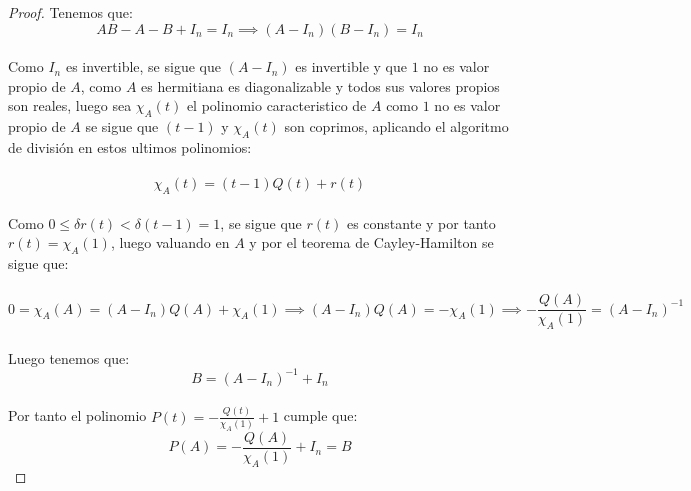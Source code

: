 \documentclass[11pt]{article}
\begin{document}
\begin{proof}
    Tenemos que:\,\\
    \begin{equation*}
        AB-A-B+I_n=I_n\implies (A-I_n)(B-I_n)=I_n
    \end{equation*}\,\\
    Como $I_n$ es invertible, se sigue que $(A-I_n)$ es invertible y que $1$ no es valor propio de $A$, como $A$ es hermitiana es diagonalizable y todos sus valores propios son reales, luego sea $\chi_A(t)$ el polinomio caracteristico de $A$
    como $1$ no es valor propio de $A$ se sigue que $(t-1)$ y $\chi_A(t)$ son coprimos, aplicando el algoritmo de divisi\'on en estos ultimos polinomios:\,\\
    \,\\
    \begin{equation*}
        \chi_A(t)=(t-1)Q(t)+r(t)
    \end{equation*}\,\\
    Como $0\leq \delta r(t)<\delta(t-1)=1$, se sigue que $r(t)$ es constante y por tanto $r(t)=\chi_A(1)$, luego
    valuando en $A$ y por el teorema de Cayley-Hamilton se sigue que:\,\\
    \,\\
    \begin{equation*}
        0=\chi_A(A)=(A-I_n)Q(A)+\chi_A(1)\implies (A-I_n)Q(A)=-\chi_A(1)\implies -\frac{Q(A)}{\chi_A(1)}=(A-I_n)^{-1}
    \end{equation*}\,\\
    Luego tenemos que:\,\\
    \begin{equation*}
        B=(A-I_n)^{-1}+I_n
    \end{equation*}\,\\
    Por tanto el polinomio $P(t)=-\frac{Q(t)}{\chi_A(1)}+1$  cumple que:\,\\
    \begin{equation*}
        P(A)=-\frac{Q(A)}{\chi_A(1)}+I_n=B
    \end{equation*}
\end{proof}
\end{document}
